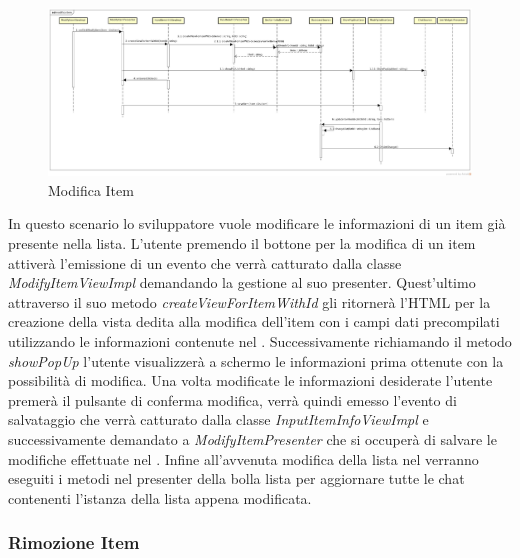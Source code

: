 \label{Modifica Item}
\begin{figure}[H]
	\centering
	\includegraphics[width=\textwidth]{Sezioni/Diagrammi/App/modifica_item.jpg}
	\caption{Modifica Item}
\end{figure}

In questo scenario lo sviluppatore vuole modificare le informazioni di un item già presente nella lista. L'utente premendo il bottone per la modifica di un item attiverà l'emissione di un evento che verrà catturato dalla classe \textit{ModifyItemViewImpl} demandando la gestione al suo presenter. Quest'ultimo attraverso il suo metodo \textit{createViewForItemWithId} gli ritornerà l'HTML per la creazione della vista dedita alla modifica dell'item con i campi dati precompilati utilizzando le informazioni contenute nel . Successivamente richiamando il metodo \textit{showPopUp} l'utente visualizzerà a schermo le informazioni prima ottenute con la possibilità di modifica. Una volta modificate le informazioni desiderate l'utente premerà il pulsante di conferma modifica, verrà quindi emesso l'evento di salvataggio che verrà catturato dalla classe \textit{InputItemInfoViewImpl} e successivamente demandato a \textit{ModifyItemPresenter} che si occuperà di salvare le modifiche effettuate nel . Infine all'avvenuta modifica della lista nel  verranno eseguiti i metodi nel presenter della bolla lista per aggiornare tutte le chat contenenti l'istanza della lista appena modificata. 

\subsubsection{Rimozione Item}

